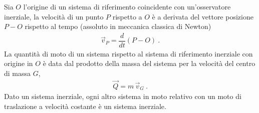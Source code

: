 \documentclass[letterpaper,10pt,italian]{jupyterBook}
\begin{document}
\sphinxAtStartPar
{}
Sia \(O\) l’origine di un sistema di riferimento coincidente con un’osservatore inerziale, la velocità di un punto \(P\) rispetto a \(O\) è a derivata del vettore posizione \(P - O\) rispetto al tempo (assoluto in meccanica classica di Newton)
\begin{equation*}
\begin{split}\vec{v}_P = \dfrac{d}{dt} (P - O) \ .\end{split}
\end{equation*}
\sphinxAtStartPar
La quantità di moto di un sistema rispetto al sistema di riferimento inerziale con origine in \(O\) è data dal prodotto della massa del sistema per la velocità del centro di massa \(G\),
\begin{equation*}
\begin{split}\vec{Q} = m \, \vec{v}_G \ .\end{split}
\end{equation*}
\sphinxAtStartPar
{}
Dato un sistema inerziale, ogni altro sistema in moto relativo con un moto di traslazione a velocità costante è un sistema inerziale.

\sphinxAtStartPar
{} 
\end{document}
